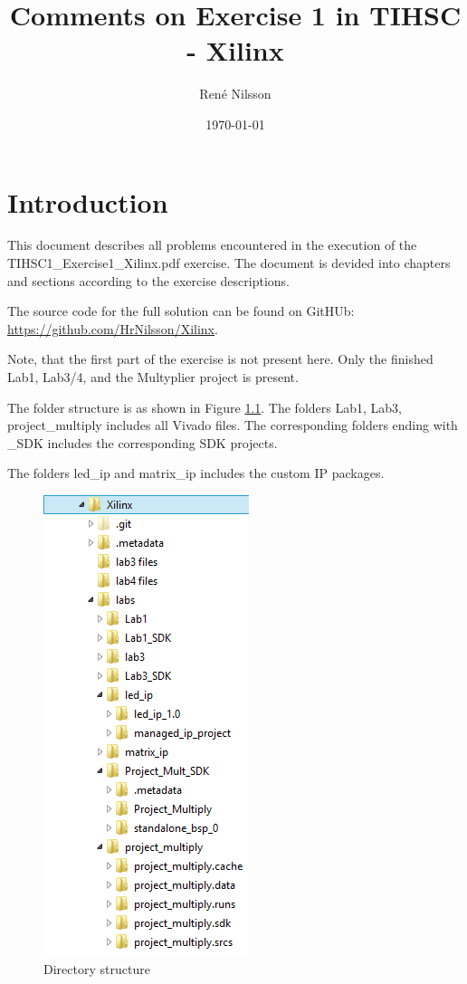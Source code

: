 \documentclass[]{report}
\begin{document}
\title{Comments on Exercise 1 in TIHSC - Xilinx}
\author{Ren\'e Nilsson}
\date{\today}
\maketitle

\chapter{Introduction}
This document describes all problems encountered in the execution of the TIHSC1\_Exercise1\_Xilinx.pdf exercise.
The document is devided into chapters and sections according to the exercise descriptions.

The source code for the full solution can be found on GitHUb:
\url{https://github.com/HrNilsson/Xilinx}.

Note, that the first part of the exercise is not present here. Only the finished Lab1, Lab3/4, and the Multyplier project is present.

The folder structure is as shown in Figure \ref{fig:DirStruct}.
The folders Lab1, Lab3, project\_multiply includes all Vivado files. The corresponding folders ending with \_SDK includes the corresponding SDK projects.

The folders led\_ip and matrix\_ip includes the custom IP packages.
\begin{figure}[H]
\begin{center}
\includegraphics[width=.3\textwidth]{Figures/DirectoryStructure.png}	
\caption{Directory structure}
\label{fig:DirStruct}
\end{center}

\end{figure}
\end{document}
